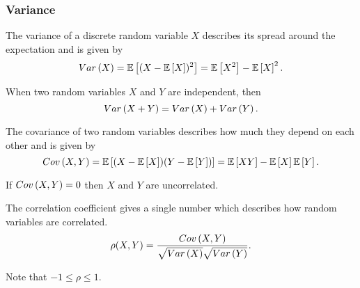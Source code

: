 \subsubsection{Variance}
\begin{definition}
  The variance of a discrete random variable $X$ describes its spread around the expectation and is given by
  \[
	Var\left(X\right) = \mathbb{E}\left[(X-\mathbb{E}\left[X\right])^2\right] = \mathbb{E}\left[X^2\right]-\mathbb{E}\left[X\right]^2.
  \]
  \label{defn:drv-variance}
\end{definition}
\begin{theorem}
  When two random variables $X$ and $Y$ are independent, then 
  \[
	Var\left(X+Y\right) = Var\left(X\right) + Var\left(Y\right).
  \]
  \label{thm:indep-var}
\end{theorem}
\begin{definition}
  The covariance of two random variables describes how much they depend on each other and is given by
  \[
	Cov\left(X, Y\right) = \mathbb{E}\left[(X-\mathbb{E}\left[X\right])(Y-\mathbb{E}\left[Y\right])\right] = \mathbb{E}\left[XY\right] - \mathbb{E}\left[X\right]\mathbb{E}\left[Y\right].
  \]
  \label{defn:cov}
\end{definition}
If $Cov\left(X,Y\right) = 0$ then $X$ and $Y$ are uncorrelated.
\begin{definition}
  The correlation coefficient gives a single number which describes how random variables are correlated.
  \[
	\rho(X, Y) = \frac{Cov\left(X, Y\right)}{\sqrt{Var\left(X\right)}\sqrt{Var\left(Y\right)}}.
  \]
  \label{defn:correlation}
\end{definition}
Note that $-1\leq \rho \leq 1$.
